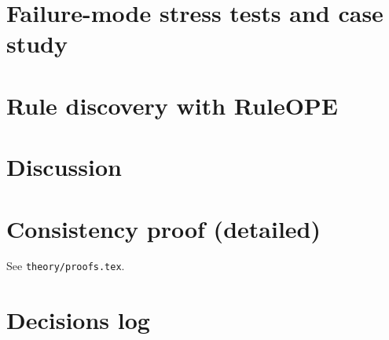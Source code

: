 \documentclass[11pt]{article}
\begin{document}
\section{Failure-mode stress tests and case study}
\label{sec:failure}


\section{Rule discovery with RuleOPE}
\label{sec:discovery}


\section{Discussion}
\label{sec:disc}


\appendix
\section{Consistency proof (detailed)}
See \texttt{theory/proofs.tex}.

\section{Decisions log}


\end{document}
